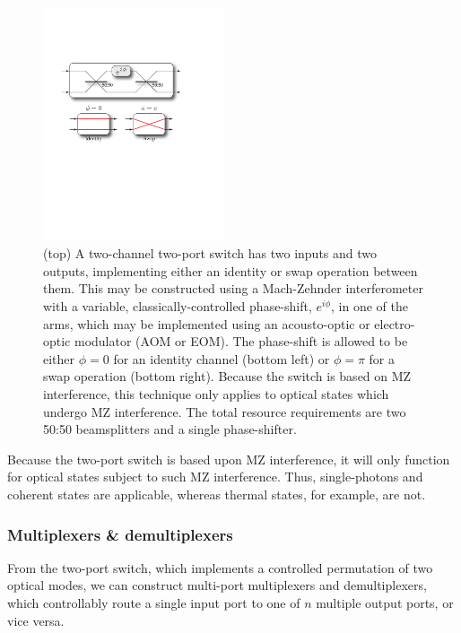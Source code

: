 \begin{figure}[!htbp]
\includegraphics[clip=true, width=0.475\textwidth]{two_channel_two_port_switch}
\captionspacefig \caption{(top) A two-channel two-port switch has two inputs and two outputs, implementing either an identity or swap operation between them. This may be constructed using a Mach-Zehnder interferometer with a variable, classically-controlled phase-shift, $e^{i\phi}$, in one of the arms, which may be implemented using an acousto-optic or electro-optic modulator (AOM or EOM). The phase-shift is allowed to be either \mbox{$\phi=0$} for an identity channel (bottom left) or \mbox{$\phi=\pi$} for a swap operation (bottom right). Because the switch is based on MZ interference, this technique only applies to optical states which undergo MZ interference. The total resource requirements are two 50:50 beamsplitters and a single phase-shifter.} \label{fig:two_channel_two_port_switch} 
\end{figure}

Because the two-port switch is based upon MZ interference, it will only function for optical states subject to such MZ interference. Thus, single-photons and coherent states are applicable, whereas thermal states, for example, are not.

%
%

\subsubsection{Multiplexers \& demultiplexers} 

From the two-port switch, which implements a controlled permutation of two optical modes, we can construct multi-port multiplexers and demultiplexers, which controllably route a single input port to one of $n$ multiple output ports, or vice versa.


